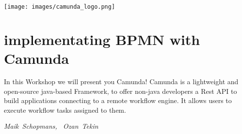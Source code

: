 \hfill\texttt{[image: images/camunda\_logo.png]}
\section*{implementating BPMN with Camunda}

In this Workshop we will present you Camunda!
Camunda is a lightweight and open-source java-based Framework, to offer non-java developers a Rest API to build applications connecting to a remote workflow engine. It allows users to execute workflow tasks assigned to them.

\hfill\textit{Maik~Schopmans, ~Ozan~Tekin}
